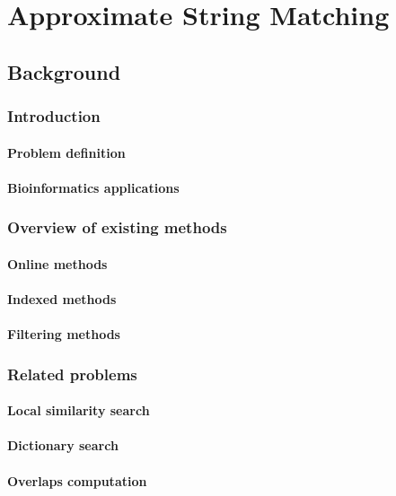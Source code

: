 \part{Approximate String Matching}

\chapter{Background}
\section{Introduction}
\subsection{Problem definition}
\subsection{Bioinformatics applications}
\section{Overview of existing methods}
\subsection{Online methods}
\subsection{Indexed methods}
\subsection{Filtering methods}
\section{Related problems}
\subsection{Local similarity search}
\subsection{Dictionary search}
\subsection{Overlaps computation}

